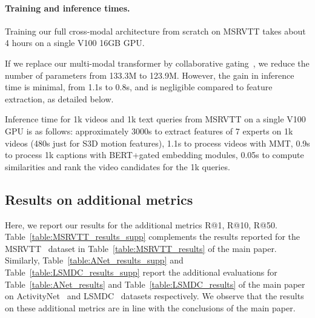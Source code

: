 \documentclass[runningheads]{llncs}
\begin{document}
\paragraph{Training and inference times.} Training our full cross-modal architecture from scratch on MSRVTT takes about 4 hours on a single V100 16GB GPU.

If we replace our multi-modal transformer by collaborative gating~\cite{liu2019use}, we reduce the number of parameters from 133.3M to 123.9M. However, the gain in inference time is minimal, from 1.1s to 0.8s, and is negligible compared to feature extraction, as detailed below.

Inference time for 1k videos and 1k text queries from MSRVTT on a single V100 GPU is as follows: approximately 3000s to extract features of 7 experts on 1k videos (480s just for S3D motion features), 1.1s to process videos with MMT, 0.9s to process 1k captions with BERT+gated embedding modules, 0.05s to compute similarities and rank the video candidates for the 1k queries.


\subsection{Results on additional metrics}
Here, we report our results for the additional metrics R@1, R@10, R@50. Table~\ref{table:MSRVTT_results_supp} complements the results reported for the MSRVTT~\cite{xu2016msrvtt} dataset in 
Table~\ref{table:MSRVTT_results}
of the main paper. Similarly, Table~\ref{table:ANet_results_supp} and Table~\ref{table:LSMDC_results_supp} report the additional evaluations  for  
Table~\ref{table:ANet_results} and Table~\ref{table:LSMDC_results} 
of the main paper on ActivityNet~\cite{krishna2017activitynet} and LSMDC~\cite{Rohrbach2015LSMDC} datasets respectively. 
We observe that the results on these additional metrics are in line with the conclusions of the main paper.
\end{document}
